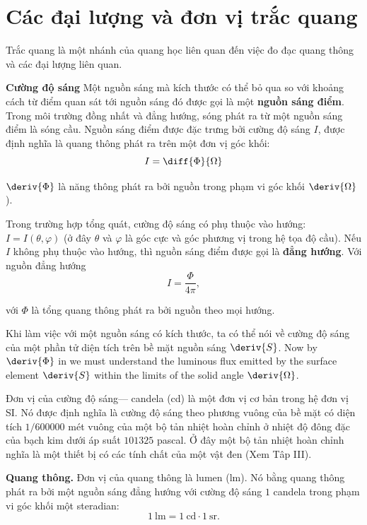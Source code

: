 \section{Các đại lượng và đơn vị trắc quang}\label{sec:16_5}

Trắc quang là một nhánh của quang học liên quan đến việc đo đạc quang thông và các đại lượng liên quan.

\textbf{Cường độ sáng}
Một nguồn sáng mà kích thước có thể bỏ qua so với khoảng cách từ điểm quan sát tới nguồn sáng đó được gọi là một \textbf{nguồn sáng điểm}.
Trong môi trường đồng nhất và đẳng hướng, sóng phát ra từ một nguồn sáng điểm là sóng cầu.
Nguồn sáng điểm được đặc trưng bởi cường độ sáng $I$, được định nghĩa là quang thông phát ra trên một đơn vị góc khối:
\begin{equation}\label{eq:16_40}
    I = \diff{\Phi}{\Omega}
\end{equation}

\noindent
$\deriv{\Phi}$ là năng thông phát ra bởi nguồn trong phạm vi góc khối $\deriv{\Omega}$).

Trong trường hợp tổng quát, cường độ sáng có phụ thuộc vào hướng: $I=I(\theta,\varphi)$ (ở đây $\theta$ và $\varphi$ là góc cực và góc phương vị trong hệ tọa độ cầu).
Nếu $I$ không phụ thuộc vào hướng, thì nguồn sáng điểm được gọi là \textbf{đẳng hướng}.
Với nguồn đẳng hướng
\begin{equation}\label{eq:16_41}
    I = \frac{\Phi}{4\pi},
\end{equation}

\noindent
với $\Phi$ là tổng quang thông phát ra bởi nguồn theo mọi hướng.

Khi làm việc với một nguồn sáng có kích thước, ta có thể nói về cường độ sáng của một phần tử diện tích trên bề mặt nguồn sáng $\deriv{S}$.
Now by $\deriv{\Phi}$ in  we must understand the luminous flux emitted by the surface
element $\deriv{S}$ within the limits of the solid angle $\deriv{\Omega}$.

Đơn vị của cường độ sáng--- candela (\si{\candela}) là một đơn vị cơ bản trong hệ đơn vị SI.
Nó được định nghĩa là cường độ sáng theo phương vuông của bề mặt có diện tích $1/600000$ mét vuông của một bộ tản nhiệt hoàn chỉnh ở nhiệt độ đông đặc của bạch kim dưới áp suất $101325$ pascal.
Ở đây một bộ tản nhiệt hoàn chỉnh nghĩa là một thiết bị có các tính chất của một vật đen (Xem Tâp III).

\textbf{Quang thông.}
Đơn vị của quang thông là lumen (\si{\lumen}).
Nó bằng quang thông phát ra bởi một nguồn sáng đẳng hướng với cường độ sáng $1$ candela trong phạm vi góc khối một steradian:
\begin{equation}\label{eq:16_42}
    \SI{1}{\lumen} = \SI{1}{\candela} \cdot \SI{1}{\steradian}.
\end{equation}

